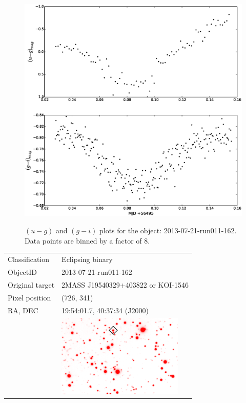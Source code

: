 \begin{figure}
  \center
  \includegraphics[width=120mm]{images/2013-07-21-run011-162_colourcurve-bin8.eps}
  \label{fig:2013-07-21-run011-162-colour}
  \caption{$(u - g)$ and $(g - i)$ plots for the object: 2013-07-21-run011-162. Data points are binned by a factor of 8.}
\end{figure} 


\begin{tabular}{l l}
  Classification & Eclipsing binary \\
  ObjectID & 2013-07-21-run011-162 \\
  Original target & 2MASS J19540329+403822 or KOI-1546 \\
  Pixel position & (726, 341) \\
  RA, DEC & 19:54:01.7, 40:37:34 (J2000) \\
       & \includegraphics[width=60mm]{images/2013-07-21-run011-162.png} \\
\end{tabular}

